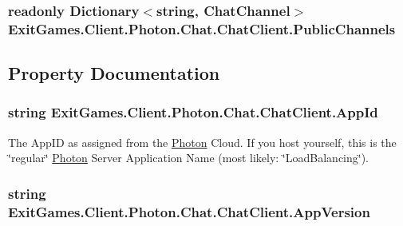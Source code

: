 \subsubsection[{\texorpdfstring{Public\+Channels}{PublicChannels}}]{\setlength{\rightskip}{0pt plus 5cm}readonly Dictionary$<$string, {\bf Chat\+Channel}$>$ Exit\+Games.\+Client.\+Photon.\+Chat.\+Chat\+Client.\+Public\+Channels}\hypertarget{class_exit_games_1_1_client_1_1_photon_1_1_chat_1_1_chat_client_aa3d4261b652969dd5f94971ca48f5a7e}{}\label{class_exit_games_1_1_client_1_1_photon_1_1_chat_1_1_chat_client_aa3d4261b652969dd5f94971ca48f5a7e}


\subsection{Property Documentation}
\subsubsection[{\texorpdfstring{App\+Id}{AppId}}]{\setlength{\rightskip}{0pt plus 5cm}string Exit\+Games.\+Client.\+Photon.\+Chat.\+Chat\+Client.\+App\+Id\hspace{0.3cm}{\ttfamily [get]}}\hypertarget{class_exit_games_1_1_client_1_1_photon_1_1_chat_1_1_chat_client_a876c9a53400fe18fc365775ca728928f}{}\label{class_exit_games_1_1_client_1_1_photon_1_1_chat_1_1_chat_client_a876c9a53400fe18fc365775ca728928f}


The App\+ID as assigned from the \hyperlink{namespace_exit_games_1_1_client_1_1_photon}{Photon} Cloud. If you host yourself, this is the \char`\"{}regular\char`\"{} \hyperlink{namespace_exit_games_1_1_client_1_1_photon}{Photon} Server Application Name (most likely\+: \char`\"{}\+Load\+Balancing\char`\"{}).

\subsubsection[{\texorpdfstring{App\+Version}{AppVersion}}]{\setlength{\rightskip}{0pt plus 5cm}string Exit\+Games.\+Client.\+Photon.\+Chat.\+Chat\+Client.\+App\+Version\hspace{0.3cm}{\ttfamily [get]}}\hypertarget{class_exit_games_1_1_client_1_1_photon_1_1_chat_1_1_chat_client_a96bec51384215e8622397b8fe2fc90e1}{}\label{class_exit_games_1_1_client_1_1_photon_1_1_chat_1_1_chat_client_a96bec51384215e8622397b8fe2fc90e1}


